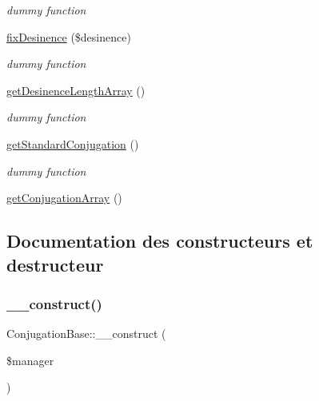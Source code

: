 \begin{DoxyCompactItemize}
\begin{DoxyCompactList}\small\item\em dummy function \end{DoxyCompactList}\item 
\hyperlink{class_conjugation_base_ab983db20dcc0f19fdce07fd4a8fdbc18}{fix\+Desinence} (\$desinence)
\begin{DoxyCompactList}\small\item\em dummy function \end{DoxyCompactList}\item 
\hyperlink{class_conjugation_base_a9b0524f2dde45dcdc8f6c27d673c827a}{get\+Desinence\+Length\+Array} ()
\begin{DoxyCompactList}\small\item\em dummy function \end{DoxyCompactList}\item 
\hyperlink{class_conjugation_base_a97684bf47a4b158a2d4f5716f9187730}{get\+Standard\+Conjugation} ()
\begin{DoxyCompactList}\small\item\em dummy function \end{DoxyCompactList}\item 
\hyperlink{class_conjugation_base_a4358d211e7c70a82657e5418a554a555}{get\+Conjugation\+Array} ()
\end{DoxyCompactItemize}


\subsection{Documentation des constructeurs et destructeur}
\hypertarget{class_conjugation_base_aff646e04e878c9dd1473de4619fe1bcc}{}\label{class_conjugation_base_aff646e04e878c9dd1473de4619fe1bcc} 
\subsubsection{\texorpdfstring{\+\_\+\+\_\+construct()}{\_\_construct()}}
{\footnotesize\ttfamily Conjugation\+Base\+::\+\_\+\+\_\+construct (\begin{DoxyParamCaption}\item[{\hyperlink{class_conjugation_manager_base}{Conjugation\+Manager\+Base}}]{\$manager }\end{DoxyParamCaption})}



